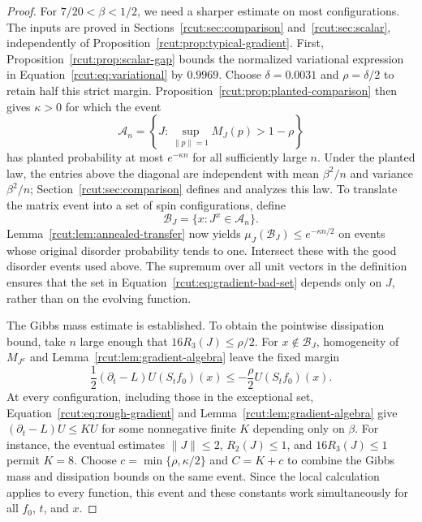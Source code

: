 \begin{proof}
For $7/20<\beta<1/2$, we need a sharper estimate on most
configurations.  The inputs are proved in
Sections~\ref{rcut:sec:comparison} and~\ref{rcut:sec:scalar}, independently
of Proposition~\ref{rcut:prop:typical-gradient}.
First, Proposition~\ref{rcut:prop:scalar-gap} bounds the normalized
variational expression in Equation~\eqref{rcut:eq:variational} by $0.9969$.
Choose $\delta=0.0031$ and $\rho=\delta/2$ to retain half this strict
margin.  Proposition~\ref{rcut:prop:planted-comparison} then gives
$\kappa>0$ for which the event
\[
 \mathcal A_n=
 \left\{J:\sup_{\|p\|=1}M_J(p)>1-\rho\right\}
\]
has planted probability at most $e^{-\kappa n}$ for all sufficiently
large $n$.  Under the planted law, the entries above the diagonal are
independent with mean $\beta^2/n$ and variance $\beta^2/n$;
Section~\ref{rcut:sec:comparison} defines and analyzes this law.
To translate the matrix event into a set of spin configurations, define
\begin{equation}
 \mathcal B_J=\{x:J^x\in\mathcal A_n\}.
\label{rcut:eq:gradient-bad-set}
\end{equation}
Lemma~\ref{rcut:lem:annealed-transfer} now yields
$\mu_J(\mathcal B_J)\le e^{-\kappa n/2}$ on events whose original
disorder probability tends to one.  Intersect these with the good
disorder events used above.  The supremum over all unit vectors in the
definition ensures that the set in
Equation~\eqref{rcut:eq:gradient-bad-set} depends only on $J$, rather
than on the evolving function.

The Gibbs mass estimate is established.  To obtain the pointwise
dissipation bound, take $n$ large enough that $16R_3(J)\le\rho/2$.
For $x\notin\mathcal B_J$, homogeneity of $M_{J^x}$ and
Lemma~\ref{rcut:lem:gradient-algebra} leave the fixed margin
\[
 \frac12(\partial_t-L)U(S_tf_0)(x)
 \le-\frac\rho2 U(S_tf_0)(x).
\]
At every configuration, including those in the exceptional set,
Equation~\eqref{rcut:eq:rough-gradient} and
Lemma~\ref{rcut:lem:gradient-algebra} give $(\partial_t-L)U\le K U$
for some nonnegative finite $K$ depending only on $\beta$.
For instance, the eventual estimates $\|J\|\le2$, $R_2(J)\le1$,
and $16R_3(J)\le1$ permit $K=8$.
Choose $c=\min\{\rho,\kappa/2\}$ and $C=K+c$ to combine the Gibbs
mass and dissipation bounds on the same event.  Since the local
calculation applies to every function, this event and these constants
work simultaneously for all $f_0$, $t$, and $x$.
\end{proof}
